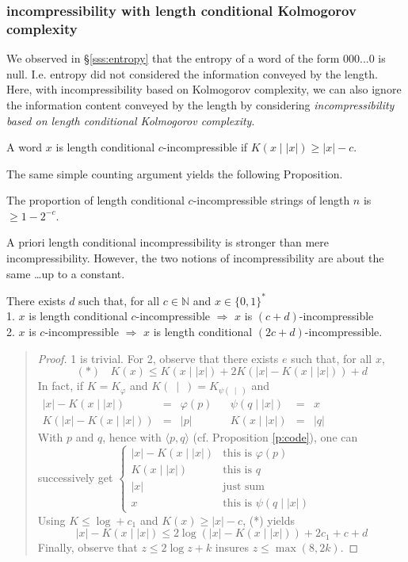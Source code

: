 \subsubsection{incompressibility with length conditional
Kolmogorov complexity}
We observed in \S\ref{sss:entropy} that the entropy of a word
of the form $000...0$ is null.
I.e. entropy did not considered the information conveyed by
the length.
\\
Here, with incompressibility based on Kolmogorov complexity,
we can also ignore the information content conveyed by the length
by considering {\em incompressibility based on length conditional
Kolmogorov complexity}.
\begin{definition}
A word $x$ is length conditional $c$-incompressible if
$K(x\mid |x|)\geq|x|-c$.
\end{definition}
The same simple counting argument yields the following Proposition.
\begin{proposition}
The proportion of length conditional $c$-incompressible
strings of length $n$ is $\geq 1-2^{-c}$.
\end{proposition}
A priori length conditional incompressibility is stronger
than mere incompressibility.
However, the two notions of incompressibility are about the
same \ldots up to a constant.
\begin{proposition}
There exists $d$ such that, for all $c\in{\mathbb N}$ and $x\in{\{0,1\}^*}$
\medskip\\
1. $x$ is length conditional $c$-incompressible
$\Rightarrow$ $x$ is $(c+d)$-incompressible
\medskip\\
2. $x$ is $c$-incompressible $\Rightarrow$ $x$ is length conditional
$(2c+d)$-incompressible.
\end{proposition}
{\small\begin{quote}
\begin{proof}
1 is trivial.
For 2, observe that there exists $e$ such that, for all $x$,
$$
(*)\ \ \ \ K(x) \leq K(x\mid |x|) + 2 K(|x| - K(x\mid |x|)) + d
$$
In fact, if $K=K_\varphi$ and $K(\ \mid\ )=K_{\psi(\ \mid\ )}$
and
\medskip\\
$\begin{array}{rclcrcl}
|x| - K(x\mid |x|) &=& \varphi(p)
&& \psi(q\mid|x|) &=& x
\\
K(|x| - K(x\mid |x|)) &=& |p|
&& K(x\mid |x|) &=& |q|
\end{array}$
\medskip\\
With $p$ and $q$, hence with $\langle p,q\rangle$
(cf. Proposition \ref{p:code}), one can successively get
$\left\{\begin{array}{ll}
|x| - K(x\mid |x|) & \mbox{this is $\varphi(p)$}
\\
K(x\mid |x|) & \mbox{this is $q$}
\\
|x| & \mbox{just sum}
\\
x & \mbox{this is $\psi(q\mid|x|)$}
\end{array}\right.$
\\
Using $K\leq\log+c_1$ and $K(x)\geq|x|-c$, (*) yields
$$
|x|- K(x\mid |x|) \leq 2\log(|x| - K(x\mid |x|)) + 2c_1+c+d
$$
Finally, observe that $z\leq 2\log z +k$ insures $z\leq\max(8,2k)$.
\end{proof}
\end{quote}}
